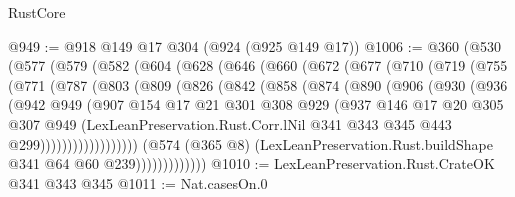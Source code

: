 \begin{lexlean}{RustCore}
\begin{coremodule}
@949 := @918 @149 @17 @304 (@924 (@925 @149 @17))
@1006 := @360
    (@530
      (@577
        (@579
          (@582
            (@604
              (@628
                (@646
                  (@660
                    (@672
                      (@677
                        (@710
                          (@719
                            (@755
                              (@771
                                (@787
                                  (@803
                                    (@809
                                      (@826
                                        (@842
                                          (@858
                                            (@874
                                              (@890
                                                (@906
                                                  (@930
                                                    (@936
                                                      (@942
                                                        @949
                                                        (@907
                                                          @154
                                                          @17
                                                          @21
                                                          @301
                                                          @308
                                                          @929
                                                          (@937
                                                            @146
                                                            @17
                                                            @20
                                                            @305
                                                            @307
                                                            @949
                                                            (LexLeanPreservation.Rust.Corr.lNil
                                                              @341
                                                              @343
                                                              @345
                                                              @443
                                                              @299))))))))))))))))))
                          (@574
                            (@365 @8)
                            (LexLeanPreservation.Rust.buildShape @341 @64 @60 @239)))))))))))))
@1010 := LexLeanPreservation.Rust.CrateOK @341 @343 @345
@1011 := Nat.casesOn.{0}

\end{coremodule}
\end{lexlean}
